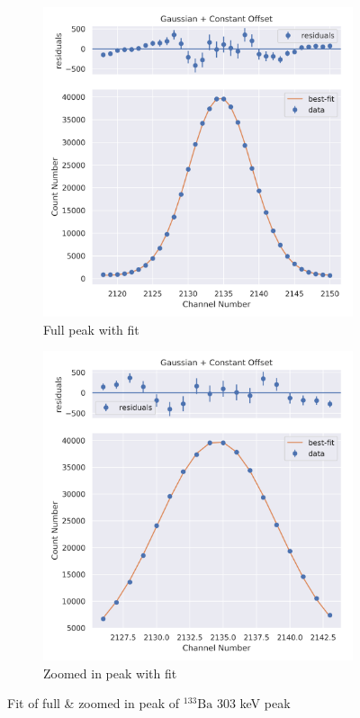 \documentclass[11pt,a4paper]{article}
\newcommand{\element}[2]{$^{#2}\textrm{#1}$}
\begin{document}
\begin{figure}[H]
  \centering
  \begin{subfigure}{.5\linewidth}
    \centering
    \includegraphics[width=\linewidth]{./Images/Barium133/Gauss/Gauss_5_Full.png}
    \caption{Full peak with fit}
  \end{subfigure}%
  \begin{subfigure}{.5\linewidth}
    \centering
    \includegraphics[width=\linewidth]{./Images/Barium133/Gauss/Gauss_5_Zoom.png}
    \caption{Zoomed in peak with fit}
  \end{subfigure}
  \caption{Fit of full \& zoomed in peak of \element{Ba}{133} 303 keV peak}
\end{figure}
\end{document}
